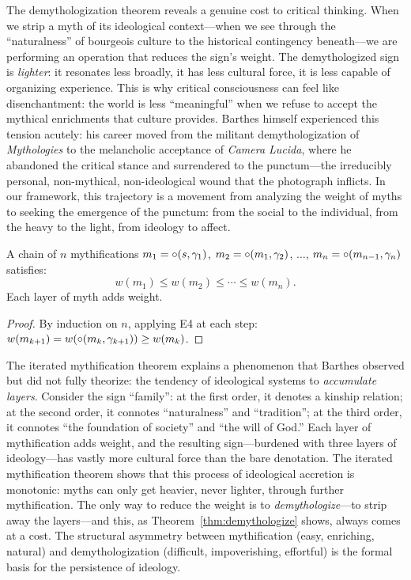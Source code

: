 \begin{interpretation}
The demythologization theorem reveals a genuine cost to critical thinking. When we strip a myth of its ideological context---when we see through the ``naturalness'' of bourgeois culture to the historical contingency beneath---we are performing an operation that reduces the sign's weight. The demythologized sign is \emph{lighter}: it resonates less broadly, it has less cultural force, it is less capable of organizing experience. This is why critical consciousness can feel like disenchantment: the world is less ``meaningful'' when we refuse to accept the mythical enrichments that culture provides. Barthes himself experienced this tension acutely: his career moved from the militant demythologization of \textit{Mythologies} to the melancholic acceptance of \textit{Camera Lucida}, where he abandoned the critical stance and surrendered to the punctum---the irreducibly personal, non-mythical, non-ideological wound that the photograph inflicts. In our framework, this trajectory is a movement from analyzing the weight of myths to seeking the emergence of the punctum: from the social to the individual, from the heavy to the light, from ideology to affect.
\end{interpretation}

\begin{theorem}
\label{thm:iterated-myth}
A chain of $n$ mythifications $m_1 = \circ(s, \gamma_1)$, $m_2 = \circ(m_1, \gamma_2)$, $\ldots$, $m_n = \circ(m_{n-1}, \gamma_n)$ satisfies:
\[
  w(m_1) \leq w(m_2) \leq \cdots \leq w(m_n).
\]
Each layer of myth adds weight.
\end{theorem}

\begin{proof}
By induction on $n$, applying E4 at each step: $w(m_{k+1}) = w(\circ(m_k, \gamma_{k+1})) \geq w(m_k)$.
\end{proof}

\begin{interpretation}
The iterated mythification theorem explains a phenomenon that Barthes observed but did not fully theorize: the tendency of ideological systems to \emph{accumulate layers}. Consider the sign ``family'': at the first order, it denotes a kinship relation; at the second order, it connotes ``naturalness'' and ``tradition''; at the third order, it connotes ``the foundation of society'' and ``the will of God.'' Each layer of mythification adds weight, and the resulting sign---burdened with three layers of ideology---has vastly more cultural force than the bare denotation. The iterated mythification theorem shows that this process of ideological accretion is monotonic: myths can only get heavier, never lighter, through further mythification. The only way to reduce the weight is to \emph{demythologize}---to strip away the layers---and this, as Theorem~\ref{thm:demythologize} shows, always comes at a cost. The structural asymmetry between mythification (easy, enriching, natural) and demythologization (difficult, impoverishing, effortful) is the formal basis for the persistence of ideology.
\end{interpretation}

